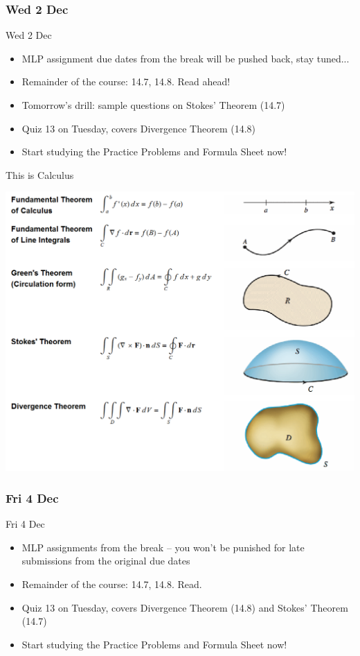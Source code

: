 \documentclass[12pt]{beamer}
\theoremstyle{plain}
\theoremstyle{definition}
\begin{document}
\subsubsection{Wed 2 Dec}
\begin{frame}{Wed 2 Dec}%
\begin{itemize}
\item MLP assignment due dates from the break will be pushed back, stay tuned...
\item Remainder of the course: 14.7, 14.8.  Read ahead!
\item Tomorrow's drill: sample questions on Stokes' Theorem (14.7)
\item Quiz 13 on Tuesday, covers Divergence Theorem (14.8)
\item Start studying the Practice Problems and Formula Sheet now!
\end{itemize}
\end{frame}

% 
\begin{frame}
\begin{center}
This is Calculus
\vspace{0.5pc}

\includegraphics[scale=.5]{fundamentalTheorems}
\end{center}
\end{frame}

\subsubsection{Fri 4 Dec}
\begin{frame}{Fri 4 Dec}%
\begin{itemize}
\item MLP assignments from the break -- you won't be punished for late submissions from the original due dates 
\item Remainder of the course: 14.7, 14.8.  Read.
\item Quiz 13 on Tuesday, covers Divergence Theorem (14.8) and Stokes' Theorem (14.7)
\item Start studying the Practice Problems and Formula Sheet now!
\end{itemize}
\end{frame}
\end{document}

